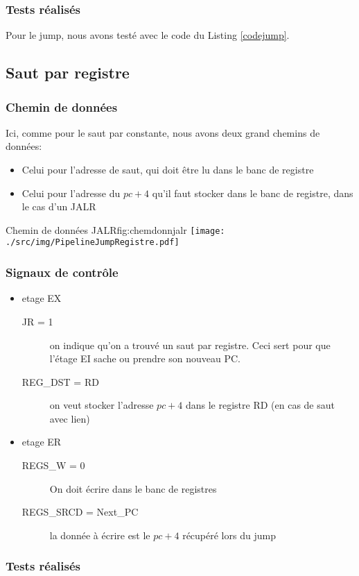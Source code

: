 \subsubsection{Tests réalisés}
Pour le jump, nous avons testé avec le code du Listing \ref{codejump}.


\subsection{Saut par registre}
\subsubsection{Chemin de données}
Ici, comme pour le saut par constante, nous avons deux grand chemins de données:
\begin{itemize}
  \item Celui pour l'adresse de saut, qui doit être lu dans le banc de registre
  \item Celui pour l'adresse du $pc+4$ qu'il faut stocker dans le banc de registre, dans le cas d'un JALR
\end{itemize}
\begin{figureGraphics}{Chemin de données JALR}{fig:chemdonnjalr}
  \centering
  \texttt{[image: ./src/img/PipelineJumpRegistre.pdf]}
\end{figureGraphics}
\subsubsection{Signaux de contrôle}
\begin{itemize}
  \item etage EX
    \begin{description}
      \item[JR = 1] on indique qu’on a trouvé un saut par registre. Ceci sert pour que l’étage EI sache ou prendre son nouveau PC.
        \item[REG\_DST = RD] on veut stocker l'adresse $pc+4$ dans le registre RD (en cas de saut avec lien)
    \end{description}
  \item etage ER
    \begin{description}
      \item[REGS\_W = 0] On doit écrire dans le banc de registres
      \item[REGS\_SRCD = Next\_PC] la donnée à écrire est le $pc+4$ récupéré lors du jump
    \end{description}
\end{itemize}
\subsubsection{Tests réalisés}



